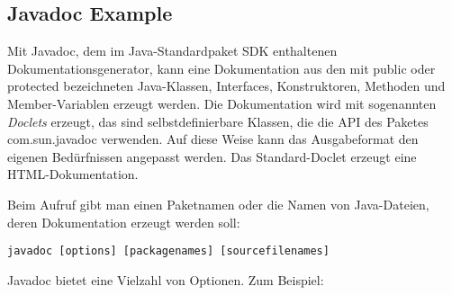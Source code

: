 \subsection{Javadoc Example}
Mit Javadoc, dem im Java-Standardpaket SDK enthaltenen
Dokumentationsgenerator, kann eine Dokumentation aus den mit public oder
protected bezeichneten Java-Klassen, Interfaces, Konstruktoren, Methoden und
Member-Variablen erzeugt werden. Die Dokumentation wird mit sogenannten {\em
  Doclets} erzeugt, das sind selbstdefinierbare Klassen, die die API des
Paketes com.sun.javadoc verwenden. Auf diese Weise kann das Ausgabeformat den
eigenen Bedürfnissen angepasst werden. Das Standard-Doclet erzeugt eine HTML-Dokumentation.

Beim Aufruf gibt man einen Paketnamen oder die Namen von Java-Dateien, deren
Dokumentation erzeugt werden soll:
\begin{verbatim}
javadoc [options] [packagenames] [sourcefilenames]
\end{verbatim}
\newslide
Javadoc bietet eine Vielzahl von Optionen. Zum Beispiel:

